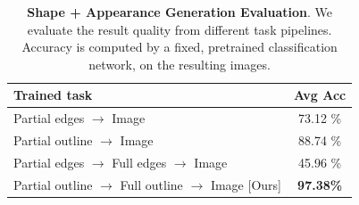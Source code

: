 

\begin{table}[t]
    \centering
        \begin{tabular}{l c}
        \toprule
        \textbf{Trained task} & \textbf{Avg Acc} \\ \midrule
        Partial edges $\rightarrow$ Image & 73.12 \% \\
        Partial outline $\rightarrow$ Image & 88.74 \% \\
        Partial edges $\rightarrow$ Full edges $\rightarrow$ Image & 45.96 \% \\
        Partial outline $\rightarrow$ Full outline $\rightarrow$ Image [Ours] & \textbf{97.38\%}  \\
        \bottomrule %
        \end{tabular}
    \caption{\label{table:2step_eval} \textbf{Shape + Appearance Generation Evaluation}. We evaluate the result quality from different task pipelines. Accuracy is computed by a fixed, pretrained classification network, on the resulting images.
    }
\end{table}


